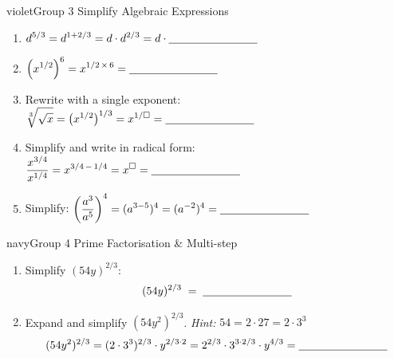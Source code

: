 \documentclass[12pt]{article}
\newcommand{\blank}{\underline{\hspace{2.8cm}}}
\begin{document}
\vspace{10pt}

\begin{pracbox}{violet}{Group 3 \quad Simplify Algebraic Expressions}
\vspace{4pt}
\begin{enumerate}[label=\textbf{\arabic*.}, itemsep=18pt, start=13]

  \item $\displaystyle d^{5/3}
        = d^{1+2/3}
        = d\cdot d^{2/3}
        = d\cdot\blank$

  \item $\displaystyle\left(x^{1/2}\right)^6
        = x^{1/2\,\times\,6}
        = \blank$

  \item Rewrite with a single exponent:\quad
        $\displaystyle\sqrt[3]{\sqrt{x}}
        = \bigl(x^{1/2}\bigr)^{1/3}
        = x^{1/\square}
        = \blank$

  \item Simplify and write in radical form:\quad
        $\displaystyle\frac{x^{3/4}}{x^{1/4}}
        = x^{3/4\,-\,1/4}
        = x^{\square}
        = \blank$

  \item Simplify:\quad
        $\displaystyle\left(\frac{a^3}{a^5}\right)^4
        =(a^{3-5})^4
        =(a^{-2})^4
        = \blank$

\end{enumerate}
\vspace{4pt}
\end{pracbox}

\newpage

\begin{pracbox}{navy}{Group 4 \quad Prime Factorisation \& Multi-step}
\vspace{4pt}
\begin{enumerate}[label=\textbf{\arabic*.}, itemsep=20pt, start=18]

  \item Simplify $(54y)^{2/3}$:\quad
        \[
        (54y)^{2/3} \;=\; \blank
        \]

  \item Expand and simplify $(54y^2)^{2/3}$. \textit{Hint:}\; $54 = 2\cdot27 = 2\cdot3^3$
        \[
        (54y^2)^{2/3}
        = (2\cdot 3^3)^{2/3}\cdot y^{2/3 \cdot 2}
        = 2^{2/3}\cdot 3^{3\cdot 2/3}\cdot y^{4/3}
        = \blank
        \]

\end{enumerate}
\vspace{4pt}
\end{pracbox}
\end{document}

